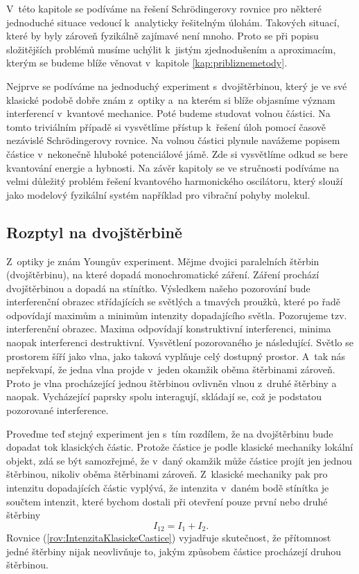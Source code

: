 V~této kapitole se podíváme na řešení Schrödingerovy rovnice pro některé jednoduché situace vedoucí k~analyticky řešitelným úlohám. Takových situací, které by byly zároveň fyzikálně zajímavé není mnoho. Proto se při popisu složitějších problémů musíme uchýlit k~jistým zjednodušením a aproximacím, kterým se budeme blíže věnovat v~kapitole \ref{kap:pribliznemetody}.

Nejprve se podíváme na jednoduchý experiment s~dvojštěrbinou, který je ve své klasické podobě dobře znám z~optiky a~na kterém si blíže objasníme význam interferencí v~kvantové mechanice. Poté budeme studovat volnou částici. Na tomto triviálním případě si vysvětlíme přístup k~řešení úloh pomocí časově nezávislé Schrödingerovy rovnice. Na volnou částici plynule navážeme popisem částice v~nekonečně hluboké potenciálové jámě. Zde si vysvětlíme odkud se bere kvantování energie a hybnosti. Na závěr kapitoly se ve stručnosti podíváme na velmi důležitý problém řešení kvantového harmonického oscilátoru, který slouží jako modelový fyzikální systém například pro vibrační pohyby molekul.

\subsection{Rozptyl na dvojštěrbině}
\label{kap:RozptylSterbina}

Z~optiky je znám Youngův experiment. Mějme dvojici paralelních štěrbin (dvojštěrbinu), na které dopadá monochromatické záření. Záření prochází dvojštěrbinou a  dopadá na stínítko. Výsledkem našeho pozorování bude interferenční obrazec střídajících se světlých a tmavých proužků, které po řadě odpovídají maximům a minimům intenzity dopadajícího světla. Pozorujeme tzv. interferenční obrazec. Maxima odpovídají konstruktivní interferenci, minima naopak interferenci destruktivní. Vysvětlení pozorovaného je následující. Světlo se prostorem šíří jako vlna, jako taková vyplňuje celý dostupný prostor. A~tak nás nepřekvapí, že jedna vlna projde v~jeden okamžik oběma štěrbinami zároveň. Proto je vlna procházející jednou štěrbinou ovlivněn vlnou z~druhé štěrbiny a naopak. Vycházející paprsky spolu interagují, skládají se, což je podstatou pozorované interference.

Proveďme teď stejný experiment jen s~tím rozdílem, že na dvojštěrbinu bude dopadat tok klasických částic. Protože částice je podle klasické mechaniky lokální objekt, zdá se být samozřejmé, že v~daný okamžik může částice projít jen jednou štěrbinou, nikoliv oběma štěrbinami zároveň. Z~klasické mechaniky pak pro intenzitu dopadajících částic vyplývá, že intenzita v~daném bodě stínítka je součtem intenzit, které bychom dostali při otevření pouze první nebo druhé štěrbiny
\begin{equation}
I_{12} = I_1 + I_2 \mbox{.}
\label{rov:IntenzitaKlasickeCastice}
\end{equation}
Rovnice (\ref{rov:IntenzitaKlasickeCastice}) vyjadřuje skutečnost, že přítomnost jedné štěrbiny nijak neovlivňuje to, jakým způsobem částice procházejí druhou štěrbinou.

